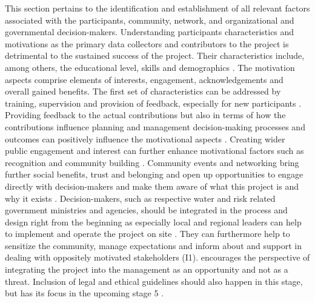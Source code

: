 This section pertains to the identification and establishment of all relevant factors associated with the participants, community, network, and organizational and governmental decision-makers. Understanding participants characteristics and motivations as the primary data collectors and contributors to the project is detrimental to the sustained success of the project. Their characteristics include, among others, the educational level, skills and demographics \autocite{cervoniImplementingIntegratedWater2008,fraislCitizenScienceEnvironmental2022}. The motivation aspects comprise elements of interests, engagement, acknowledgements and overall gained benefits. The first set of characteristics can be addressed by training, supervision and provision of feedback, especially for new participants \autocite{escaeuropeancitizenscienceassociationTenPrinciplesCitizen2015,fraislCitizenScienceEnvironmental2022,minkmanCitizenScienceWater2015,sharpeCommunityBasedEcological2006}. Providing feedback to the actual contributions but also in terms of how the contributions influence planning and management decision-making processes and outcomes can positively influence the motivational aspects \autocite{conradMeaningfulCommunityBasedEcological2006,conradReviewCitizenScience2011,whitelawEstablishingCanadianCommunity2003}. Creating wider public engagement and interest can further enhance motivational factors such as recognition and community building \autocite{conradMeaningfulCommunityBasedEcological2006}. Community events and networking bring further social benefits, trust and belonging and open up opportunities to engage directly with decision-makers and make them aware of what this project is and why it exists \autocite{conradMeaningfulCommunityBasedEcological2006,fraislCitizenScienceEnvironmental2022,sharpeCommunityBasedEcological2006}. Decision-makers, such as respective water and risk related government ministries and agencies, should be integrated in the process and design right from the beginning as especially local and regional leaders can help to implement and operate the project on site \autocite{gualazziniEWEAEarlyWarning2021,ifrcCommunityBasedSurveillanceGuiding2017}. They can furthermore help to sensitize the community, manage expectations and inform about and support in dealing with oppositely motivated stakeholders (I1). \autocite{conradMeaningfulCommunityBasedEcological2006} encourages the perspective of integrating the project into the management as an opportunity and not as a threat. Inclusion of legal and ethical guidelines should also happen in this stage, but has its focus in the upcoming stage 5 \autocite{fraislCitizenScienceEnvironmental2022, ifrcCommunityBasedSurveillanceGuiding2017,minkmanCitizenScienceWater2015}.

